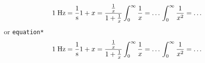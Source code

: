 \documentclass{ximera}
\begin{document}
\begin{example}
\begin{equation}
    1\; \textrm{Hz}   = \frac{1}{\textrm{s}}          \\
    1 + x             = \frac{\frac1x}{1+\frac{1}{x}} \\
    \int_0^\infty \frac{1}{x}  =  \ldots \\
    \int_0^\infty \frac{1}{x^2}  =  \ldots 
\end{equation}
or \verb|equation*|
\begin{equation*}
    1\; \textrm{Hz}   = \frac{1}{\textrm{s}}          \\
    1 + x             = \frac{\frac1x}{1+\frac{1}{x}} \\
    \int_0^\infty \frac{1}{x}  =  \ldots \\
    \int_0^\infty \frac{1}{x^2}  =  \ldots 
\end{equation*}

\end{example}

\end{document}
